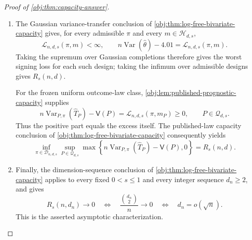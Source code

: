 \documentclass[11pt]{article}
\begin{document}
\begin{proof}[Proof of \cref{obj:thm:capacity-answer}]
\begin{enumerate}
\item The Gaussian variance-transfer conclusion of \cref{obj:thm:log-free-bivariate-capacity} gives, for every admissible \(\pi\) and every \(m\in\mathcal H_{d,s}\),
\[
\mathcal L_{n,d,s}(\pi,m)<\infty,
\qquad
n\operatorname{Var}(\widehat\theta)-4.01
=\mathcal L_{n,d,s}(\pi,m).
\]
Taking the supremum over Gaussian completions therefore gives the worst signing loss for each such design; taking the infimum over admissible designs gives \(R_s(n,d)\).

For the frozen uniform outcome-law class, \cref{obj:lem:published-prognostic-capacity} supplies
\[
n\operatorname{Var}_{P,\pi}(\widehat T_P)-\mathsf V(P)
=\mathcal L_{n,d,s}(\pi,m_P)\geq0,
\qquad P\in\mathcal Q_{d,s}.
\]
Thus the positive part equals the excess itself. The published-law capacity conclusion of \cref{obj:thm:log-free-bivariate-capacity} consequently yields
\[
\inf_{\pi\in\mathcal D_{n,d,s}}
\sup_{P\in\mathcal Q_{d,s}}
\max\!\left\{
n\operatorname{Var}_{P,\pi}(\widehat T_P)-\mathsf V(P),0
\right\}
=R_s(n,d).
\]

\item Finally, the dimension-sequence conclusion of \cref{obj:thm:log-free-bivariate-capacity} applies to every fixed \(0<s\leq1\) and every integer sequence \(d_n\geq2\), and gives
\[
R_s(n,d_n)\longrightarrow0
\quad\Longleftrightarrow\quad
\frac{\binom{d_n}{2}}n\longrightarrow0
\quad\Longleftrightarrow\quad
d_n=o(\sqrt n).
\]
This is the asserted asymptotic characterization.
\end{enumerate}
\end{proof}




\end{document}
